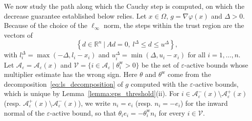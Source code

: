 \documentclass[pdflatex,sn-mathphys-num]{sn-jnl}%
\theoremstyle{thmstyleone}%
\newcommand{\RR}{{\mathbb{R}}} %
\newcommand{\calA}{{\mathcal{A}}}
\begin{document}
We now study the path along which the Cauchy step is computed, on which the decrease guarantee established below relies. Let $x \in \Omega$, $g = \nabla\varphi(x)$ and $\Delta > 0$. Because of the choice of the $\ell_\infty$ norm, the steps within the trust region are the vectors of
\begin{equation}\label{eq:proj_grad_feasible_set}
	\left\{d \in \RR^n \ | \ Ad=0,\ l^\Delta \le d \le u^\Delta\right\},
\end{equation}
with $l^\Delta_i = \max\left(-\Delta,l_i-x_i\right)$ and $u^\Delta_i = \min\left(\Delta,u_i-x_i\right)$ for all $i=1,\ldots,n$. Let $\calA_\varepsilon = \calA_\varepsilon(x)$ and $\mathcal{V} = \{i \in \calA_\varepsilon \mid \theta^{\mathrm{w}}_i > 0\}$ be the set of $\varepsilon$-active bounds whose multiplier estimate has the wrong sign. Here $\theta$ and $\theta^{\mathrm{w}}$ come from the decomposition~\eqref{eq:ls_decomposition} of $g$ computed with the $\varepsilon$-active bounds, which is unique by Lemma~\ref{lemma:eps_threshold}(ii). For $i \in \calA_\varepsilon^-(x)\setminus\calA_\varepsilon^+(x)$ (resp. $\calA_\varepsilon^+(x)\setminus\calA_\varepsilon^-(x)$), we write $n_i = e_i$ (resp. $n_i = -e_i$) for the inward normal of the $\varepsilon$-active bound, so that $\theta_ie_i = -\theta^{\mathrm{w}}_in_i$ for every $i \in \mathcal{V}$.
\end{document}
